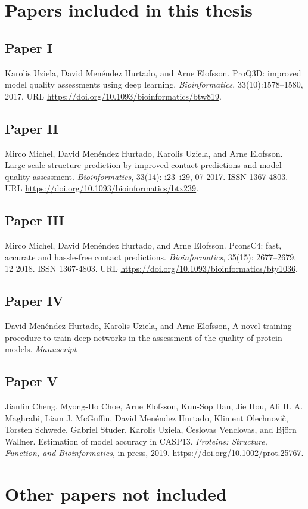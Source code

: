 \chapter*{Papers included in this thesis}

\section*{Paper \textcolor[cmyk]{0, 0.87, 0.68, 0.32}{I}}
Karolis Uziela, David Menéndez Hurtado, and Arne Elofsson.
ProQ3D: improved model quality assessments using deep learning. \textit{Bioinformatics}, 33(10):1578–1580, 2017.
URL \url{ https://doi.org/10.1093/bioinformatics/btw819}.

\section*{Paper  \textcolor[cmyk]{0, 0.87, 0.68, 0.32}{II}}
Mirco Michel, David Menéndez Hurtado, Karolis Uziela, and Arne Elofsson.
Large-scale structure
prediction by improved contact predictions and model quality assessment. \textit{Bioinformatics}, 33(14):
i23–i29, 07 2017. ISSN 1367-4803. URL
\url{https://doi.org/10.1093/bioinformatics/btx239}.


\section*{Paper \textcolor[cmyk]{0, 0.87, 0.68, 0.32}{III}}
Mirco Michel, David Menéndez Hurtado, and Arne Elofsson. PconsC4: fast, accurate and hassle-free
contact predictions. \textit{Bioinformatics}, 35(15): 2677–2679, 12 2018. ISSN 1367-4803. URL \url{https://doi.org/10.1093/bioinformatics/bty1036}.


\section*{Paper \textcolor[cmyk]{0, 0.87, 0.68, 0.32}{IV}}
David Menéndez Hurtado, Karolis Uziela, and Arne Elofsson, A novel training procedure to train deep networks in the assessment of the quality of protein models. \emph{Manuscript}


\section*{Paper \textcolor[cmyk]{0, 0.87, 0.68, 0.32}{V}}

Jianlin Cheng, Myong-Ho Choe, Arne Elofsson, Kun-Sop Han, Jie Hou, Ali H. A. Maghrabi, Liam J.
McGuffin, David Menéndez Hurtado, Kliment Olechnovič, Torsten Schwede, Gabriel Studer, Karolis
Uziela, Česlovas Venclovas, and Björn Wallner. Estimation of model accuracy in CASP13. \emph{Proteins:
Structure, Function, and Bioinformatics}, in press, 2019. \url{https://doi.org/10.1002/prot.25767}.

\chapter*{Other papers not included}

